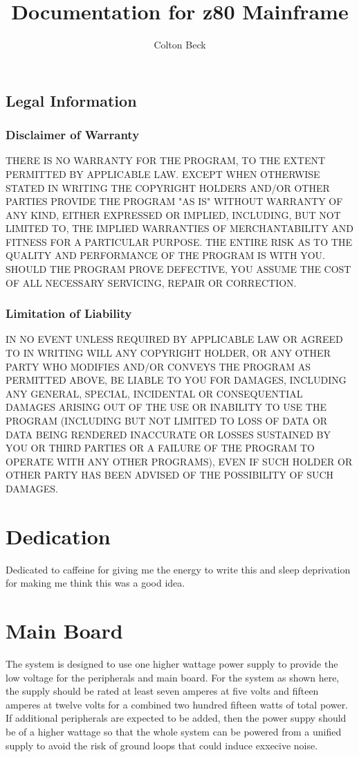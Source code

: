 \documentclass{book}
\begin{document}
\frontmatter
\title{Documentation for z80 Mainframe}
\author{Colton Beck}
\maketitle
\section*{Legal Information}
\subsection*{Disclaimer of Warranty}

  THERE IS NO WARRANTY FOR THE PROGRAM, TO THE EXTENT PERMITTED BY
APPLICABLE LAW.  EXCEPT WHEN OTHERWISE STATED IN WRITING THE COPYRIGHT
HOLDERS AND/OR OTHER PARTIES PROVIDE THE PROGRAM "AS IS" WITHOUT WARRANTY
OF ANY KIND, EITHER EXPRESSED OR IMPLIED, INCLUDING, BUT NOT LIMITED TO,
THE IMPLIED WARRANTIES OF MERCHANTABILITY AND FITNESS FOR A PARTICULAR
PURPOSE.  THE ENTIRE RISK AS TO THE QUALITY AND PERFORMANCE OF THE PROGRAM
IS WITH YOU.  SHOULD THE PROGRAM PROVE DEFECTIVE, YOU ASSUME THE COST OF
ALL NECESSARY SERVICING, REPAIR OR CORRECTION.

\subsection*{Limitation of Liability}

  IN NO EVENT UNLESS REQUIRED BY APPLICABLE LAW OR AGREED TO IN WRITING
WILL ANY COPYRIGHT HOLDER, OR ANY OTHER PARTY WHO MODIFIES AND/OR CONVEYS
THE PROGRAM AS PERMITTED ABOVE, BE LIABLE TO YOU FOR DAMAGES, INCLUDING ANY
GENERAL, SPECIAL, INCIDENTAL OR CONSEQUENTIAL DAMAGES ARISING OUT OF THE
USE OR INABILITY TO USE THE PROGRAM (INCLUDING BUT NOT LIMITED TO LOSS OF
DATA OR DATA BEING RENDERED INACCURATE OR LOSSES SUSTAINED BY YOU OR THIRD
PARTIES OR A FAILURE OF THE PROGRAM TO OPERATE WITH ANY OTHER PROGRAMS),
EVEN IF SUCH HOLDER OR OTHER PARTY HAS BEEN ADVISED OF THE POSSIBILITY OF
SUCH DAMAGES.
\chapter*{Dedication}
Dedicated to caffeine for giving me the energy to write this and sleep deprivation for making me think this was a good idea.
\tableofcontents
\listoffigures
\listoftables
\mainmatter
\chapter{Main Board}
The system is designed to use one higher wattage power supply to provide the low voltage for the peripherals and main board. For the system as shown here, the supply should be rated at least seven amperes at five volts and fifteen amperes at twelve volts for a combined two hundred fifteen watts of total power. If additional peripherals are expected to be added, then the power suppy should be of a higher wattage so that the whole system can be powered from a unified supply to avoid the risk of ground loops that could induce exxecive noise.
\end{document}
